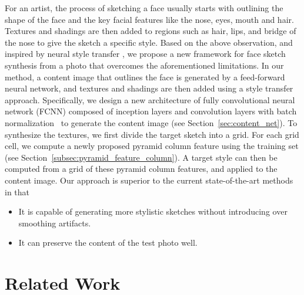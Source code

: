 \documentclass[10pt,twocolumn,letterpaper]{article}
\begin{document}
For an artist, the process of sketching a face usually starts with outlining the shape of the face and the key facial features like the nose, eyes, mouth and hair. Textures and shadings are then added to regions such as hair, lips, and bridge of the nose to give the sketch a specific style. Based on the above observation, and inspired by neural style transfer \cite{gatys2015texture}, we propose a new framework for face sketch synthesis from a  photo that overcomes the aforementioned limitations. In our method, a content image that outlines the face is generated by a feed-forward neural network, and textures and shadings are then added using a style transfer approach. Specifically, we design a new architecture of fully convolutional neural network (FCNN) composed of inception layers \cite{szegedy2015going} and convolution layers with batch normalization~\cite{Sergey2015batch} to generate the content image (see Section~\ref{sec:content_net}). To synthesize the textures, we first divide the target sketch into a grid. For each grid cell, we compute a newly proposed pyramid column feature using the training set (see Section~\ref{subsec:pyramid_feature_column}). A target style can then be computed from a grid of these pyramid column features, and applied to the content image. Our approach is superior to the current state-of-the-art methods in that
\begin{itemize}
\item It is capable of generating more stylistic sketches without introducing over smoothing artifacts.
\item It can preserve the content of the test photo well.
\end{itemize}

\section{Related Work}\label{sec:related_work}
\end{document}

